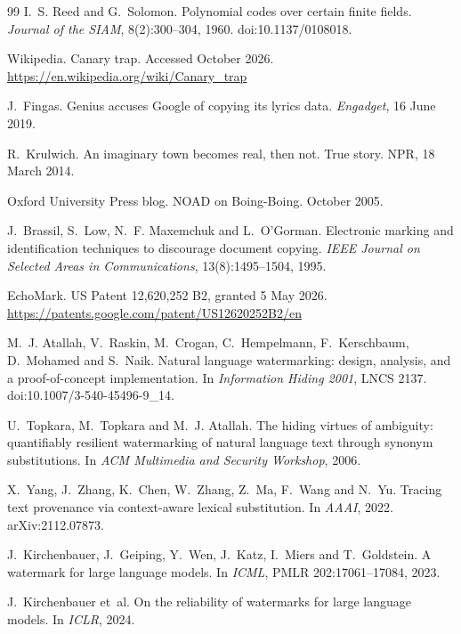 \documentclass[10pt,a4paper]{article}
\theoremstyle{remark}
\begin{document}
\begin{thebibliography}{99}
 I.~S. Reed and G.~Solomon. Polynomial codes over certain finite fields. \emph{Journal of the SIAM}, 8(2):300--304, 1960. doi:10.1137/0108018.

 Wikipedia. Canary trap. Accessed October 2026. \url{https://en.wikipedia.org/wiki/Canary_trap}

 J.~Fingas. Genius accuses Google of copying its lyrics data. \emph{Engadget}, 16 June 2019.

 R.~Krulwich. An imaginary town becomes real, then not. True story. NPR, 18 March 2014.

 Oxford University Press blog. NOAD on Boing-Boing. October 2005.

 J.~Brassil, S.~Low, N.~F. Maxemchuk and L.~O'Gorman. Electronic marking and identification techniques to discourage document copying. \emph{IEEE Journal on Selected Areas in Communications}, 13(8):1495--1504, 1995.

 EchoMark. US Patent 12,620,252 B2, granted 5 May 2026. \url{https://patents.google.com/patent/US12620252B2/en}

 M.~J. Atallah, V.~Raskin, M.~Crogan, C.~Hempelmann, F.~Kerschbaum, D.~Mohamed and S.~Naik. Natural language watermarking: design, analysis, and a proof-of-concept implementation. In \emph{Information Hiding 2001}, LNCS 2137. doi:10.1007/3-540-45496-9\_14.

 U.~Topkara, M.~Topkara and M.~J. Atallah. The hiding virtues of ambiguity: quantifiably resilient watermarking of natural language text through synonym substitutions. In \emph{ACM Multimedia and Security Workshop}, 2006.

 X.~Yang, J.~Zhang, K.~Chen, W.~Zhang, Z.~Ma, F.~Wang and N.~Yu. Tracing text provenance via context-aware lexical substitution. In \emph{AAAI}, 2022. arXiv:2112.07873.

 J.~Kirchenbauer, J.~Geiping, Y.~Wen, J.~Katz, I.~Miers and T.~Goldstein. A watermark for large language models. In \emph{ICML}, PMLR 202:17061--17084, 2023.

 J.~Kirchenbauer et~al. On the reliability of watermarks for large language models. In \emph{ICLR}, 2024.


\end{thebibliography}
\end{document}

